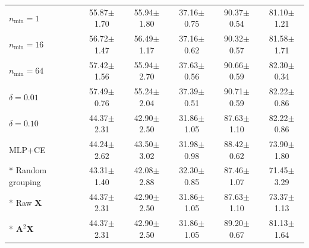 \begin{longtable}{@{}lccccc@{}}
\(n_{\min}=1\) & 55.87\ensuremath{\pm}1.70 & 55.94\ensuremath{\pm}1.80 & 37.16\ensuremath{\pm}0.75 & 90.37\ensuremath{\pm}0.54 & 81.10\ensuremath{\pm}1.21 \\
\(n_{\min}=16\) & 56.72\ensuremath{\pm}1.47 & 56.49\ensuremath{\pm}1.17 & 37.16\ensuremath{\pm}0.62 & 90.32\ensuremath{\pm}0.57 & 81.58\ensuremath{\pm}1.71 \\
\(n_{\min}=64\) & 57.42\ensuremath{\pm}1.56 & 55.94\ensuremath{\pm}2.70 & 37.63\ensuremath{\pm}0.56 & 90.66\ensuremath{\pm}0.59 & 82.30\ensuremath{\pm}0.34 \\
\(\delta=0.01\) & 57.49\ensuremath{\pm}0.76 & 55.24\ensuremath{\pm}2.04 & 37.39\ensuremath{\pm}0.51 & 90.71\ensuremath{\pm}0.59 & 82.22\ensuremath{\pm}0.86 \\
\(\delta=0.10\) & 44.37\ensuremath{\pm}2.31 & 42.90\ensuremath{\pm}2.50 & 31.86\ensuremath{\pm}1.05 & 87.63\ensuremath{\pm}1.10 & 82.22\ensuremath{\pm}0.86 \\
\midrule
MLP+CE & 44.24\ensuremath{\pm}2.62 & 43.50\ensuremath{\pm}3.02 & 31.98\ensuremath{\pm}0.98 & 88.42\ensuremath{\pm}0.62 & 73.90\ensuremath{\pm}1.80 \\*
Random grouping & 43.31\ensuremath{\pm}1.40 & 42.08\ensuremath{\pm}2.88 & 32.30\ensuremath{\pm}0.85 & 87.46\ensuremath{\pm}1.07 & 71.45\ensuremath{\pm}3.29 \\*
Raw \(\mathbf{X}\) & 44.37\ensuremath{\pm}2.31 & 42.90\ensuremath{\pm}2.50 & 31.86\ensuremath{\pm}1.05 & 87.63\ensuremath{\pm}1.10 & 73.37\ensuremath{\pm}1.13 \\*
\(\mathbf{A}^2\mathbf{X}\) & 44.37\ensuremath{\pm}2.31 & 42.90\ensuremath{\pm}2.50 & 31.86\ensuremath{\pm}1.05 & 89.20\ensuremath{\pm}0.67 & 81.13\ensuremath{\pm}1.64 \\
\end{longtable}
\endgroup
